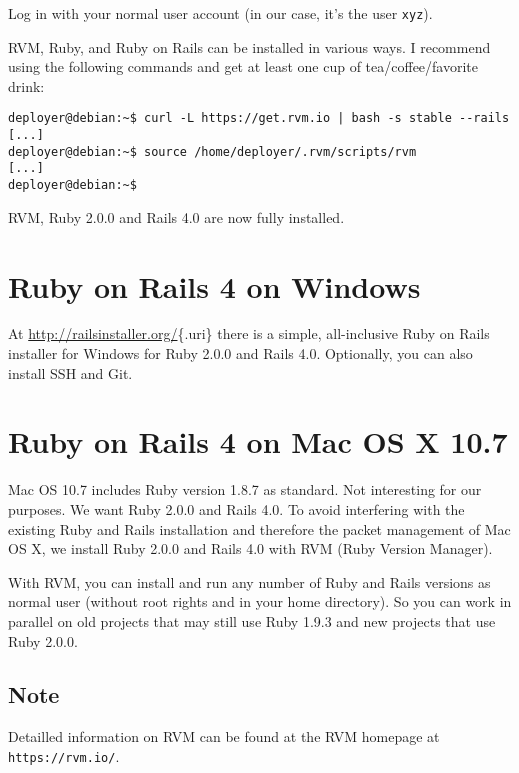 \documentclass[a4paper]{book}
\newcounter{tab}[chapter]
\begin{document}
Log in with your normal user account (in our case, it's the user \texttt{xyz}).

RVM, Ruby, and Ruby on Rails can be installed in various ways. I recommend using the following commands and get at least one cup of tea/coffee/favorite drink:

\begin{shaded}\begin{verbatim}
deployer@debian:~$ curl -L https://get.rvm.io | bash -s stable --rails
[...]
deployer@debian:~$ source /home/deployer/.rvm/scripts/rvm
[...]
deployer@debian:~$
\end{verbatim}\end{shaded}

RVM, Ruby 2.0.0 and Rails 4.0 are now fully installed.

\section{Ruby on Rails 4 on Windows}\label{ruby-on-rails-4-on-windows}

At \url{http://railsinstaller.org/}\{.uri\} there is a simple, all-inclusive Ruby on Rails installer for Windows for Ruby 2.0.0 and Rails 4.0. Optionally, you can also install SSH and Git.

\section{Ruby on Rails 4 on Mac OS X 10.7}\label{ruby-on-rails-4-on-mac-os-x-10.7}

Mac OS 10.7 includes Ruby version 1.8.7 as standard. Not interesting for our purposes. We want Ruby 2.0.0 and Rails 4.0. To avoid interfering with the existing Ruby and Rails installation and therefore the packet management of Mac OS X, we install Ruby 2.0.0 and Rails 4.0 with RVM (Ruby Version Manager).

With RVM, you can install and run any number of Ruby and Rails versions as normal user (without root rights and in your home directory). So you can work in parallel on old projects that may still use Ruby 1.9.3 and new projects that use Ruby 2.0.0.

\subsection{Note}\label{note-2}

Detailled information on RVM can be found at the RVM homepage at \texttt{https://rvm.io/}.
\end{document}
